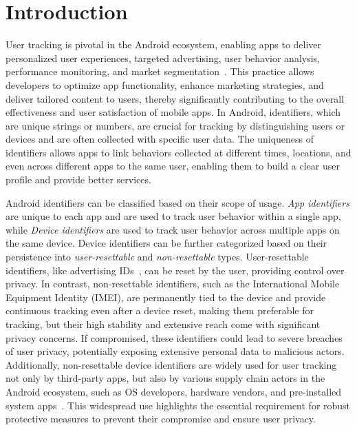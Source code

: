 \section{Introduction}
\label{sec:introduction}

User tracking is pivotal in the Android ecosystem, enabling apps to deliver personalized user experiences, targeted advertising, user behavior analysis, performance monitoring, and market segmentation~\cite{kollnig2022iphones, binns2018third, razaghpanah2018apps, lerner2016internet, nath2015madscope, yang2020comparative}. 
This practice allows developers to optimize app functionality, enhance marketing strategies, and deliver tailored content to users, thereby significantly contributing to the overall effectiveness and user satisfaction of mobile apps.
In Android, identifiers, which are unique strings or numbers, are crucial for tracking by distinguishing users or devices and are often collected with specific user data.
The uniqueness of identifiers allows apps to link behaviors collected at different times, locations, and even across different apps to the same user, enabling them to build a clear user profile and provide better services.

Android identifiers can be classified based on their scope of usage. 
\textit{App identifiers} are unique to each app and are used to track user behavior within a single app, while \textit{Device identifiers} are used to track user behavior across multiple apps on the same device. 
Device identifiers can be further categorized based on their persistence into \textit{user-resettable} and \textit{non-resettable} types. 
User-resettable identifiers, like advertising IDs~\cite{advertisingid}, can be reset by the user, providing control over privacy. 
In contrast, non-resettable identifiers, such as the International Mobile Equipment Identity (IMEI), are permanently tied to the device and provide continuous tracking even after a device reset, making them preferable for tracking, but their high stability and extensive reach come with significant privacy concerns.
If compromised, these identifiers could lead to severe breaches of user privacy, potentially exposing extensive personal data to malicious actors.
Additionally, non-resettable device identifiers are widely used for user tracking not only by third-party apps, but also by various supply chain actors in the Android ecosystem, such as OS developers, hardware vendors, and pre-installed system apps~\cite{lyons2023log, gamba2020analysis, schindler2022privacy, leith2021mobile, liu2021android, reardon201950, demetriou2016free, chen2014information}.
This widespread use highlights the essential requirement for robust protective measures to prevent their compromise and ensure user privacy.

